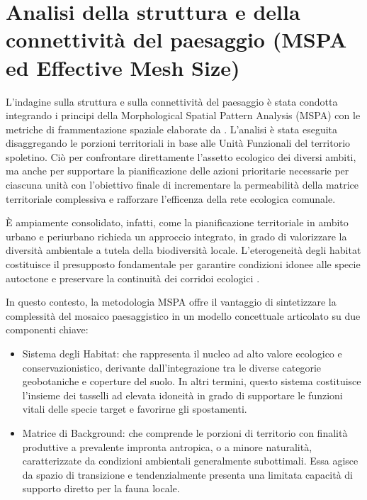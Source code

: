 \documentclass[
  a4paper,
]{book}
\providecommand{\tightlist}{%
  \setlength{\itemsep}{0pt}\setlength{\parskip}{0pt}}
\begin{document}
\section{Analisi della struttura e della connettività del paesaggio (MSPA ed Effective Mesh Size)}\label{analisi-della-struttura-e-della-connettivituxe0-del-paesaggio-mspa-ed-effective-mesh-size}

L'indagine sulla struttura e sulla connettività del paesaggio è stata condotta integrando i principi della Morphological Spatial Pattern Analysis (MSPA)\citep{vogt2025} con le metriche di frammentazione spaziale elaborate da \citep{jaeger2000}.
L'analisi è stata eseguita disaggregando le porzioni territoriali in base alle Unità Funzionali del territorio spoletino.
Ciò per confrontare direttamente l'assetto ecologico dei diversi ambiti, ma anche per supportare la pianificazione delle azioni prioritarie necessarie per ciascuna unità con l'obiettivo finale di incrementare la permeabilità della matrice territoriale complessiva e rafforzare l'efficenza della rete ecologica comunale.

È ampiamente consolidato, infatti, come la pianificazione territoriale in ambito urbano e periurbano richieda un approccio integrato, in grado di valorizzare la diversità ambientale a tutela della biodiversità locale.
L'eterogeneità degli habitat costituisce il presupposto fondamentale per garantire condizioni idonee alle specie autoctone e preservare la continuità dei corridoi ecologici \citep{battisti2004, vilenica2020}.

In questo contesto, la metodologia MSPA offre il vantaggio di sintetizzare la complessità del mosaico paesaggistico in un modello concettuale articolato su due componenti chiave:

\begin{itemize}
\tightlist
\item
  Sistema degli Habitat: che rappresenta il nucleo ad alto valore ecologico e conservazionistico, derivante dall'integrazione tra le diverse categorie geobotaniche e coperture del suolo. In altri termini, questo sistema costituisce l'insieme dei tasselli ad elevata idoneità in grado di supportare le funzioni vitali delle specie target e favorirne gli spostamenti.
\item
  Matrice di Background: che comprende le porzioni di territorio con finalità produttive a prevalente impronta antropica, o a minore naturalità, caratterizzate da condizioni ambientali generalmente subottimali. Essa agisce da spazio di transizione e tendenzialmente presenta una limitata capacità di supporto diretto per la fauna locale.
\end{itemize}
\end{document}
